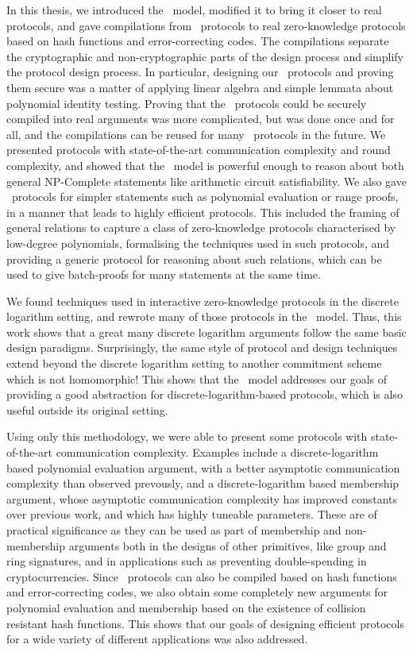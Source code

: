 In this thesis, we introduced the \ILC\ model, modified it to bring it closer to real protocols, and gave compilations from \ILC\ protocols to real zero-knowledge protocols based on hash functions and error-correcting codes. The compilations separate the cryptographic and non-cryptographic parts of the design process and simplify the protocol design process. In particular, designing our \ILC\ protocols and proving them secure was a matter of applying linear algebra and simple lemmata about polynomial identity testing. Proving that the \ILC\ protocols could be securely compiled into real arguments was more complicated, but was done once and for all, and the compilations can be reused for many \ILC\ protocols in the future. We presented protocols with state-of-the-art communication complexity and round complexity, and showed that the \ILC\ model is powerful enough to reason about both general NP-Complete statements like arithmetic circuit satisfiability. We also gave \ILC\ protocols for simpler statements such as polynomial evaluation or range proofs, in a manner that leads to highly efficient protocols. This included the framing of general relations to capture a class of zero-knowledge protocols characterised by low-degree polynomials, formalising the techniques used in such protocols, and providing a generic protocol for reasoning about such relations, which can be used to give batch-proofs for many statements at the same time.

We found techniques used in interactive zero-knowledge protocols in the discrete logarithm setting, and rewrote many of those protocols in the \ILC\ model. Thus, this work shows that a great many discrete logarithm arguments follow the same basic design paradigms. Surprisingly, the same style of protocol and design techniques extend beyond the discrete logarithm setting to another commitment scheme which is not homomorphic! This shows that the \ILC\ model addresses our goals of providing a good abstraction for discrete-logarithm-based protocols, which is also useful outside its original setting.

Using only this methodology, we were able to present some protocols with state-of-the-art communication complexity. Examples include a discrete-logarithm based polynomial evaluation argument, with a better asymptotic communication complexity than observed prevously, and a discrete-logarithm based membership argument, whose asymptotic communication complexity has improved constants over previous work, and which has highly tuneable parameters. These are of practical significance as they can be used as part of membership and non-membership arguments both in the designs of other primitives, like group and ring signatures, and in applications such as preventing double-spending in cryptocurrencies. Since \ILC\ protocols can also be compiled based on hash functions and error-correcting codes, we also obtain some completely new arguments for polynomial evaluation and membership based on the existence of collision resistant hash functions. This shows that our goals of designing efficient protocols for a wide variety of different applications was also addressed.

